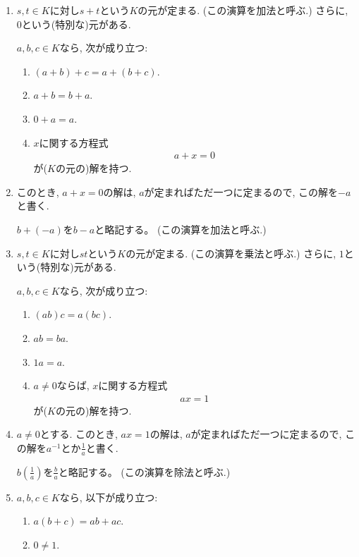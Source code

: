 \begin{enumerate}
\item
  $s,t\in K$に対し$s+t$という$K$の元が定まる.
  (この演算を加法と呼ぶ.)
  さらに, $0$という(特別な)元がある.

  $a,b,c\in K$なら, 次が成り立つ:
  \begin{enumerate}
  \item
    $(a+b)+c=a+(b+c)$.
  \item
    $a+b=b+a$.
  \item
    $0+a=a$.
  \item
    $x$に関する方程式
    \begin{align*}
      a+x=0
    \end{align*}
    が($K$の元の)解を持つ.
  \end{enumerate}
\item
  このとき, $a+x=0$の解は,
  $a$が定まればただ一つに定まるので,
  この解を$-a$と書く.

  $b+(-a)$を$b-a$と略記する。
  (この演算を加法と呼ぶ.)

\item
  $s,t\in K$に対し$st$という$K$の元が定まる.
  (この演算を乗法と呼ぶ.)
  さらに, $1$という(特別な)元がある.

  $a,b,c\in K$なら, 次が成り立つ:
  \begin{enumerate}
  \item
    $(ab)c=a(bc)$.
  \item
    $ab=ba$.
  \item
    $1a=a$.
  \item
    $a\neq 0$ならば,
    $x$に関する方程式
    \begin{align*}
      ax=1
    \end{align*}
    が($K$の元の)解を持つ.
  \end{enumerate}

\item
  $a\neq 0$とする.
  このとき, $ax=1$の解は,
  $a$が定まればただ一つに定まるので,
  この解を$a^{-1}$とか$\frac{1}{a}$と書く.

  $b(\frac{1}{a})$を$\frac{b}{a}$と略記する。
  (この演算を除法と呼ぶ.)

\item
  $a,b,c\in K$なら, 以下が成り立つ:
  \begin{enumerate}
  \item $a(b+c)=ab+ac$.
  \item $0\neq 1$.
  \end{enumerate}
\end{enumerate}

